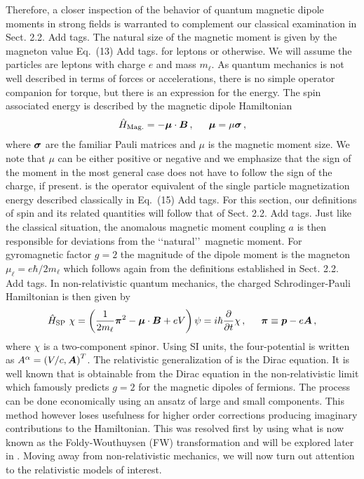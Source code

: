 Therefore, a closer inspection of the behavior of quantum magnetic dipole moments in strong fields is warranted to complement our classical examination in {\color{red}Sect. 2.2. Add tags}. The natural size of the magnetic moment is given by the magneton value {\color{red}Eq.~(13) Add tags.} for leptons or otherwise. We will assume the particles are leptons with charge $e$ and mass $m_{\ell}$. As quantum mechanics is not well described in terms of forces or accelerations, there is no simple operator companion for torque, but there is an expression for the energy. The spin associated energy is described by the magnetic dipole Hamiltonian
\begin{align}
	\label{eq:quantumdipole:01a}
    \hat{H}_{\mathrm{Mag.}}=-\bb{\mu}\cdot\bb{B}\,,\indent \bb{\mu}=\mu\bb{\sigma}\,,
\end{align}
where $\boldsymbol{\sigma}$ are the familiar Pauli matrices and $\mu$ is the magnetic moment size. We note that $\mu$ can be either positive or negative and we emphasize that the sign of the moment in the most general case does not have to follow the sign of the charge, if present.  is the operator equivalent of the single particle magnetization energy described classically in {\color{red}Eq.~(15) Add tags.} For this section, our definitions of spin and its related quantities will follow that of {\color{red}Sect. 2.2. Add tags.} Just like the classical situation, the anomalous magnetic moment coupling $a$ is then responsible for deviations from the \lq\lq natural\rq\rq\ magnetic moment. For gyromagnetic factor $g=2$ the magnitude of the dipole moment is the magneton $\mu_{\ell}=e\hbar/2m_{\ell}$ which follows again from the definitions established in {\color{red}Sect. 2.2. Add tags.} In non-relativistic quantum mechanics, the charged Schrodinger-Pauli Hamiltonian is then given by
\begin{align}
	\label{eq:quantumdipole:02}
    \hat{H}_{\mathrm{SP}}\ \chi=\left(\frac{1}{2m_{\ell}}\bb{\pi}^{2}-\bb{\mu}\cdot\bb{B}+eV\right)\psi=i\hbar\frac{\partial}{\partial t}\chi\,,\indent\bb{\pi}\equiv\bb{p}-e\bb{A}\,,
\end{align}
where $\chi$ is a two-component spinor. Using SI units, the four-potential is written as $A^{\alpha}=\left(V/c,\boldsymbol{A}\right)^{T}$. The relativistic generalization of  is the Dirac equation. It is well known that  is obtainable from the Dirac equation in the non-relativistic limit which famously predicts $g=2$ for the magnetic dipoles of fermions. The process can be done economically \cite{Sakurai:1967a} using an ansatz of large and small components. This method however loses usefulness for higher order corrections producing imaginary contributions to the Hamiltonian. This was resolved first by \cite{Foldy:1950} using what is now known as the Foldy-Wouthuysen (FW) transformation and will be explored later in . Moving away from non-relativistic mechanics, we will now turn out attention to the relativistic models of interest.


